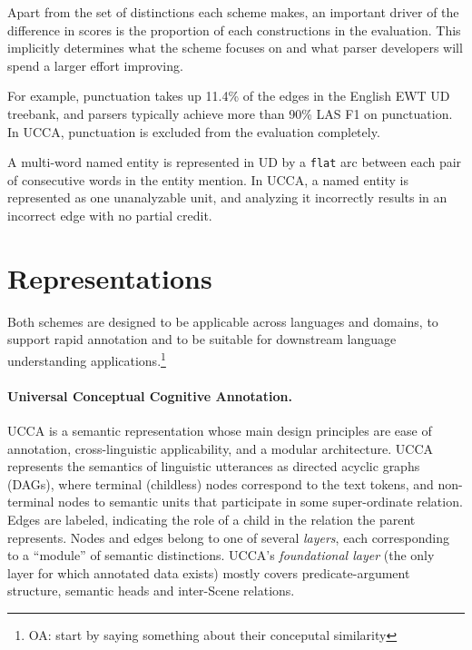 \documentclass[11pt,a4paper]{article}
\newcommand{\oa}[1]{\footnote{\color{red}OA: #1}}
\begin{document}
Apart from the set of distinctions each scheme makes,
an important driver of the difference in scores is the proportion of each constructions
in the evaluation.
This implicitly determines what the scheme focuses on and what parser developers
will spend a larger effort improving.

For example, punctuation takes up 11.4\% of the edges in the English EWT UD treebank,
and parsers typically achieve more than 90\% LAS F1 on punctuation.
In UCCA, punctuation is excluded from the evaluation completely.

A multi-word named entity is represented in UD by a \verb|flat| arc between
each pair of consecutive words in the entity mention.
In UCCA, a named entity is represented as one unanalyzable unit, and analyzing it
incorrectly results in an incorrect edge with no partial credit.



\section{Representations}\label{sec:representations}

  Both schemes are designed to be applicable across languages and domains, 
  to support rapid annotation and to be suitable for downstream language understanding applications.\oa{start by saying something about their conceputal similarity}



\paragraph{Universal Conceptual Cognitive Annotation.}\label{sec:ucca}
UCCA \cite{abend2013universal} is a semantic representation whose main design principles
are ease of annotation, cross-linguistic applicability, and a modular architecture.
UCCA represents the semantics of linguistic utterances
as directed acyclic graphs (DAGs), where terminal (childless) nodes
correspond to the text tokens, and non-terminal nodes to semantic units that participate
in some super-ordinate relation.
Edges are labeled, indicating the role of a child in the relation the parent represents.
Nodes and edges belong to one of several \textit{layers}, each corresponding
to a ``module'' of semantic distinctions.
UCCA's \textit{foundational layer} (the only layer for which annotated data exists)
mostly covers predicate-argument structure, semantic heads and inter-Scene relations.
\end{document}
